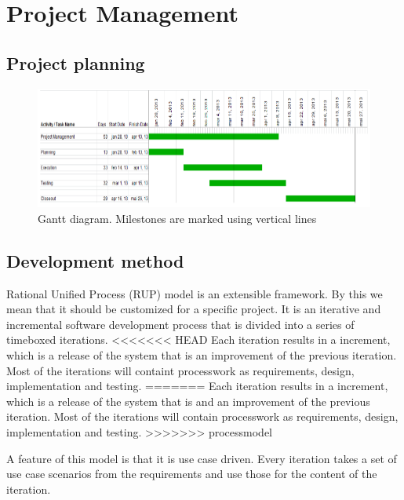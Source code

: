 \chapter{Project Management}

\section{Project planning}
\begin{figure}[H]
\includegraphics[scale=0.8]{images/gantt-diagram.png}
\caption{Gantt diagram. Milestones are marked using vertical lines}
\end{figure}

\section{Development method}

Rational Unified Process (RUP) model is an extensible framework. By this we mean that it should be customized for a specific project.
It is an iterative and incremental software development process that is divided into a series of timeboxed iterations.
<<<<<<< HEAD
Each iteration results in a increment, which is a release of the system that is an improvement of the previous iteration.
Most of the iterations will containt processwork as requirements, design, implementation and testing.
=======
Each iteration results in a increment, which is a release of the system that is and an improvement of the previous iteration.
Most of the iterations will contain processwork as requirements, design, implementation and testing.
>>>>>>> processmodel

A feature of this model is that it is use case driven. Every iteration takes a set of use case scenarios from the requirements and use those for the content of the iteration.

